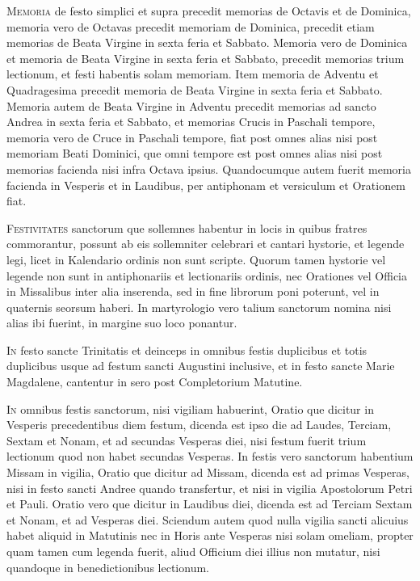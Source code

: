 \begin{multicols*}{2}
{\color{Red} }
\lettrine[lines=2]{\zallmancaps \color{Blue} M}{emoria} de festo simplici et supra precedit memorias de Octavis et de Dominica, memoria vero de Octavas precedit memoriam de Dominica, precedit etiam memorias de Beata Virgine in sexta feria et Sabbato.
Memoria vero de Dominica et memoria de Beata Virgine in sexta feria et Sabbato, precedit memorias trium lectionum, et festi habentis solam memoriam. Item memoria de Adventu et Quadragesima precedit memoria de Beata Virgine in sexta feria et Sabbato.
Memoria autem de Beata Virgine in Adventu precedit memorias ad sancto Andrea in sexta feria et Sabbato, et memorias Crucis in Paschali tempore, memoria vero de Cruce in Paschali tempore, fiat post omnes alias nisi post memoriam Beati Dominici, que omni tempore est post omnes alias nisi post memorias facienda nisi infra Octava ipsius.
Quandocumque autem fuerit memoria facienda in Vesperis et in Laudibus, per antiphonam et versiculum et Orationem fiat.

{\color{Red} }
\lettrine[lines=2]{\zallmancaps \color{Red} F}{estivitates} sanctorum que sollemnes habentur in locis in quibus fratres commorantur, possunt ab eis sollemniter celebrari et cantari hystorie, et legende legi, licet in Kalendario ordinis non sunt scripte. Quorum tamen hystorie vel legende non sunt in antiphonariis et lectionariis ordinis, nec Orationes vel Officia in Missalibus inter alia inserenda, sed in fine librorum poni poterunt, vel in quaternis seorsum haberi.
In martyrologio vero talium sanctorum nomina nisi alias ibi fuerint, in margine suo loco ponantur.

{\color{Red} }
\lettrine[lines=2]{\zallmancaps \color{Blue} I}{n} festo sancte Trinitatis et deinceps in omnibus festis duplicibus et totis duplicibus usque ad festum sancti Augustini inclusive, et in festo sancte Marie Magdalene, cantentur in sero post Completorium Matutine.

{\color{Red} }
\lettrine[lines=2]{\zallmancaps \color{Red} I}{n} omnibus festis sanctorum, nisi vigiliam habuerint, Oratio que dicitur in Vesperis precedentibus diem festum, dicenda est ipso die ad Laudes, Terciam, Sextam et Nonam, et ad secundas Vesperas diei, nisi festum fuerit trium lectionum quod non habet secundas Vesperas.
In festis vero sanctorum habentium Missam in vigilia, Oratio que dicitur ad Missam, dicenda est ad primas Vesperas, nisi in festo sancti Andree quando transfertur, et nisi in vigilia Apostolorum Petri et Pauli.
Oratio vero que dicitur in Laudibus diei, dicenda est ad Terciam Sextam et Nonam, et ad Vesperas diei. Sciendum autem quod nulla vigilia sancti alicuius habet aliquid in Matutinis nec in Horis ante Vesperas nisi solam omeliam, propter quam tamen cum legenda fuerit, aliud Officium diei illius non mutatur, nisi quandoque in benedictionibus lectionum.


\end{multicols*}
